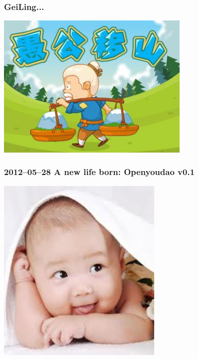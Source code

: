 \documentclass[10pt]{beamer}
\begin{document}
\begin{frame}
  \frametitle{\Large{GeiLing...}}
  
\begin{center} 
  \includegraphics[width=0.7\textwidth]{challenge.jpg}

\end{center}

\end{frame}

\begin{frame}
  \frametitle{\Large{2012--05--28 A new life born: Openyoudao v0.1}}

\begin{center} 
  \includegraphics[width=0.6\textwidth]{newlife.jpg}
\href{run:youdao-v0.1.mp4}{}

\end{center}

\end{frame}
\end{document}
